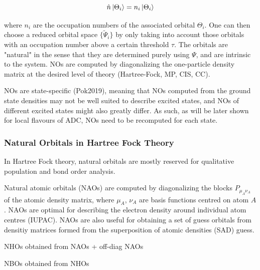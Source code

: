 \begin{equation}
\hat{n}\ket{\Theta_i} = n_i \ket{\Theta_i} 
\end{equation}

\noindent where $n_i$ are the occupation numbers of the associated orbital $\Theta_i$. One can then choose a reduced orbital space $\{\tilde{\Psi}_i\}$ by only taking into account those orbitals with an occupation number above a certain threshold $\tau$. The orbitals are "natural" in the sense that they are determined purely using $\Psi$, and are intrinsic to the system. NOs are computed by diagonalizing the one-particle density matrix at the desired level of theory (Hartree-Fock, MP, CIS, CC). 

NOs are state-specific (Pok2019), meaning that NOs computed from the ground state densities may not be well suited to describe excited states, and NOs of different excited states might also greatly differ. As such, as will be later shown for local flavours of ADC, NOs need to be recomputed for each state.


\subsubsection*{Natural Orbitals in Hartree Fock Theory}

In Hartree Fock theory, natural orbitals are mostly reserved for qualitative population and bond order analysis. 

Natural atomic orbitals (NAOs) are computed by diagonalizing the blocks $P_{\mu_A\nu_A}$ of the atomic density matrix, where ${\mu_A}$, ${\nu_A}$ are basis functions centred on atom $A$. NAOs are optimal for describing the electron density around individual atom centres (IUPAC). NAOs are also useful for obtaining a set of guess orbitals from densitiy matrices formed from the superposition of atomic densities (SAD) guess. 

NHOs obtained from NAOs + off-diag NAOs 

NBOs obtained from NHOs




